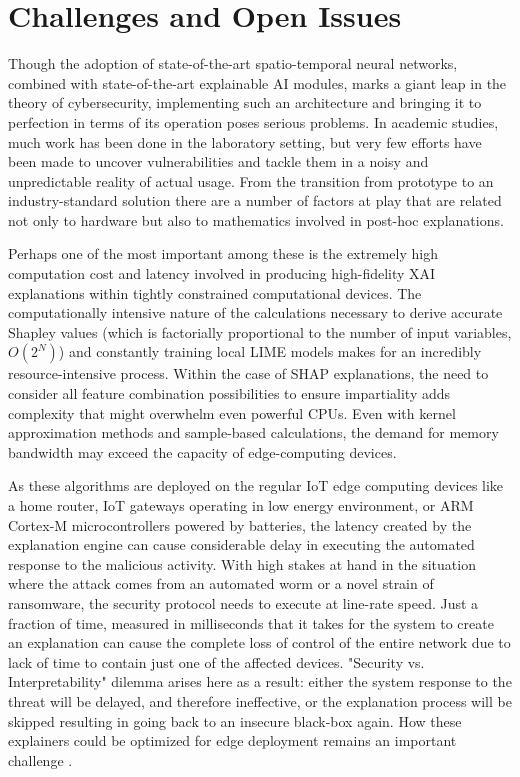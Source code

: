 \documentclass[12pt]{article}
\begin{document}
    \section{Challenges and Open Issues}
    
   Though the adoption of state-of-the-art spatio-temporal neural networks, combined with state-of-the-art explainable AI modules, marks a giant leap in the theory of cybersecurity, implementing such an architecture and bringing it to perfection in terms of its operation poses serious problems. In academic studies, much work has been done in the laboratory setting, but very few efforts have been made to uncover vulnerabilities and tackle them in a noisy and unpredictable reality of actual usage. From the transition from prototype to an industry-standard solution there are a number of factors at play that are related not only to hardware but also to mathematics involved in post-hoc explanations.

Perhaps one of the most important among these is the extremely high computation cost and latency involved in producing high-fidelity XAI explanations within tightly constrained computational devices. The computationally intensive nature of the calculations necessary to derive accurate Shapley values (which is factorially proportional to the number of input variables, $O(2^N)$) and constantly training local LIME models makes for an incredibly resource-intensive process. Within the case of SHAP explanations, the need to consider all feature combination possibilities to ensure impartiality adds complexity that might overwhelm even powerful CPUs. Even with kernel approximation methods and sample-based calculations, the demand for memory bandwidth may exceed the capacity of edge-computing devices.

As these algorithms are deployed on the regular IoT edge computing devices like a home router, IoT gateways operating in low energy environment, or ARM Cortex-M microcontrollers powered by batteries, the latency created by the explanation engine can cause considerable delay in executing the automated response to the malicious activity. With high stakes at hand in the situation where the attack comes from an automated worm or a novel strain of ransomware, the security protocol needs to execute at line-rate speed. Just a fraction of time, measured in milliseconds that it takes for the system to create an explanation can cause the complete loss of control of the entire network due to lack of time to contain just one of the affected devices. "Security vs. Interpretability" dilemma arises here as a result: either the system response to the threat will be delayed, and therefore ineffective, or the explanation process will be skipped resulting in going back to an insecure black-box again. How these explainers could be optimized for edge deployment remains an important challenge \cite{ijcrt2025threat, chen2022explainable}.
\end{document}
